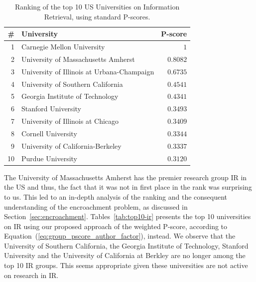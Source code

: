 \documentclass[msc]{ppgccufmg}
\begin{document}
\begin{table}[htbp]
\centering
\caption{Ranking of the top 10 US Universities on Information Retrieval, using standard P-scores.}
\label{tab:top10-ir-pscore}
\begin{tabular}{rlr}
	\toprule
	\# & University                                 & \multicolumn{1}{c}{P-score} \\
	\midrule
	1  & Carnegie Mellon University                 & $1$            \\
	2  & University of Massachusetts Amherst        & $0.8082$ \\
	3  & University of Illinois at Urbana-Champaign & $0.6735$ \\
	4  & University of Southern California          & $0.4541$ \\
	5  & Georgia Institute of Technology            & $0.4341$ \\
	6  & Stanford University                        & $0.3493$ \\
	7  & University of Illinois at Chicago          & $0.3409$ \\
	8  & Cornell University                         & $0.3344$ \\
	9  & University of California-Berkeley          & $0.3337$ \\
	10 & Purdue University                          & $0.3120$ \\
	\bottomrule
\end{tabular}
\end{table}

The University of Massachusetts Amherst has the premier research group IR in the US and thus, the fact that it was not in first place in the rank was surprising to us. This led to an in-depth analysis of the ranking and the consequent understanding of the encroachment problem, as discussed in Section~\ref{sec:encroachment}. 
%
Tables~\ref{tab:top10-ir} presents the top 10 universities on IR using our proposed approach of the weighted P-score, according to Equation~(\ref{eq:group_pscore_author_factor}), instead. We observe that the University of Southern California, the Georgia Institute of Technology, Stanford University and the University of California at Berkley are no longer among the top 10 IR groups. This seems appropriate given these universities are not active on research in IR.
\end{document}
